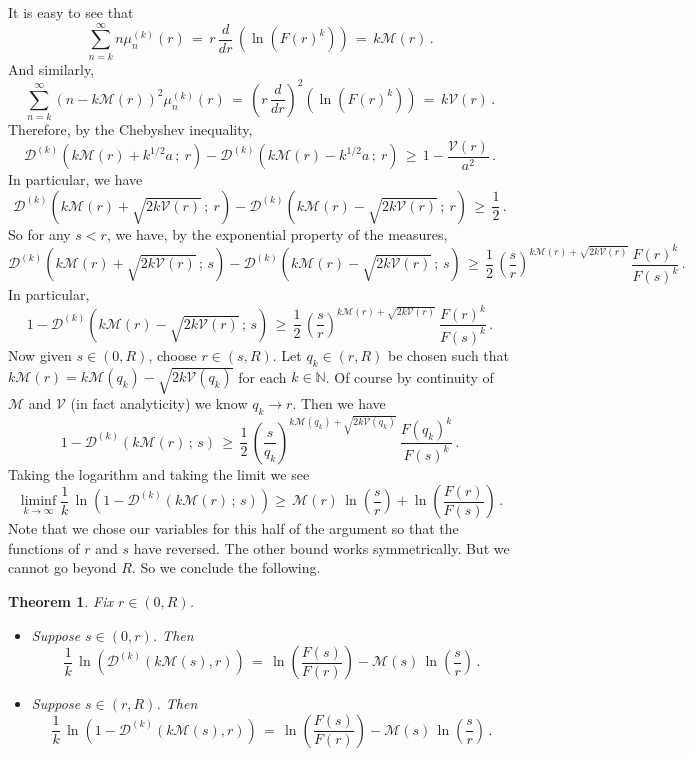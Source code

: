 \documentclass[12pt]{article}
\newtheorem{theorem}[thm]{Theorem}
\newcommand{\N}{\mathbb{N}}
\begin{document}
It is easy to see that
$$
\sum_{n=k}^{\infty} n \mu^{(k)}_n(r)\, =\, r\, \frac{d}{dr}\, \left(\ln \left(F(r)^k\right)\right)\, =\, k \mathcal{M}(r)\, .
$$
And similarly,
$$
\sum_{n=k}^{\infty} \left(n - k \mathcal{M}(r)\right)^2 \mu^{(k)}_n(r)\,
=\, \left(r\, \frac{d}{dr}\right)^2\left(\ln \left(F(r)^k\right)\right)\, =\, k \mathcal{V}(r)\, .
$$
Therefore, by the Chebyshev inequality,
$$
\mathcal{D}^{(k)}\left(k\mathcal{M}(r)+k^{1/2} a\, ;\ r\right)
-\mathcal{D}^{(k)}\left(k\mathcal{M}(r)-k^{1/2} a\, ;\ r\right)\, \geq\, 1 - \frac{\mathcal{V}(r)}{a^2}\, .
$$
In particular, we have
$$
\mathcal{D}^{(k)}\left(k\mathcal{M}(r)+\sqrt{2k\mathcal{V}(r)}\, ;\ r\right)
-\mathcal{D}^{(k)}\left(k\mathcal{M}(r)-\sqrt{2k\mathcal{V}(r)}\, ;\ r\right)\, \geq\, \frac{1}{2}\, .
$$
So for any $s<r$, we have, by the exponential property of the measures,
$$
\mathcal{D}^{(k)}\left(k\mathcal{M}(r)+\sqrt{2k\mathcal{V}(r)}\, ;\, s\right)
-\mathcal{D}^{(k)}\left(k\mathcal{M}(r)-\sqrt{2k\mathcal{V}(r)}\, ;\, s\right)\, 
\geq\, \frac{1}{2}\, \left(\frac{s}{r}\right)^{k\mathcal{M}(r)+\sqrt{2k\mathcal{V}(r)}}\, \frac{F(r)^k}{F(s)^k}\, .
$$
In particular,
$$
1-\mathcal{D}^{(k)}\left(k\mathcal{M}(r)-\sqrt{2k\mathcal{V}(r)}\, ;\, s\right)\, 
\geq\, \frac{1}{2}\, \left(\frac{s}{r}\right)^{k\mathcal{M}(r)+\sqrt{2k\mathcal{V}(r)}}\, \frac{F(r)^k}{F(s)^k}\, .
$$
Now given $s \in (0,R)$, choose $r \in (s,R)$.
Let $q_k \in (r,R)$ be chosen such that 
$k\mathcal{M}(r)=k\mathcal{M}(q_k)-\sqrt{2k\mathcal{V}(q_k)}$ for each $k\in \N$.
Of course by continuity of $\mathcal{M}$ and $\mathcal{V}$ (in fact analyticity) we know $q_k \to r$.
Then we have
$$
1-\mathcal{D}^{(k)}(k\mathcal{M}(r)\, ;\, s)\, \geq\, 
\frac{1}{2}\, \left(\frac{s}{q_k}\right)^{k\mathcal{M}(q_k)+\sqrt{2k\mathcal{V}(q_k)}}\, \frac{F(q_k)^k}{F(s)^k}\, .
$$
Taking the logarithm and taking the limit we see
$$
\liminf_{k \to \infty} \frac{1}{k}\, \ln\left(1-\mathcal{D}^{(k)}(k\mathcal{M}(r)\, ;\, s)\right)
\geq\, \mathcal{M}(r)\, \ln\left(\frac{s}{r}\right) + \ln\left(\frac{F(r)}{F(s)}\right)\, .
$$
Note that we chose our variables for this half of the argument so that the functions of $r$ and $s$
have reversed.
The other bound works symmetrically.
But we cannot go beyond $R$. So we conclude the following.

\begin{theorem}
Fix $r \in (0,R)$.
\begin{itemize}
\item
Suppose $s \in (0,r)$. Then
$$
\frac{1}{k}\, \ln\left(\mathcal{D}^{(k)}(k\mathcal{M}(s),r)\right)\, =\, \ln\left(\frac{F(s)}{F(r)}\right) - \mathcal{M}(s)\, \ln\left(\frac{s}{r}\right)\, .
$$
\item
Suppose $s \in (r,R)$. Then
$$
\frac{1}{k}\, \ln\left(1-\mathcal{D}^{(k)}(k\mathcal{M}(s),r)\right)\, =\, \ln\left(\frac{F(s)}{F(r)}\right) - \mathcal{M}(s)\, \ln\left(\frac{s}{r}\right)\, .
$$
\end{itemize}
\end{theorem}
\end{document}
